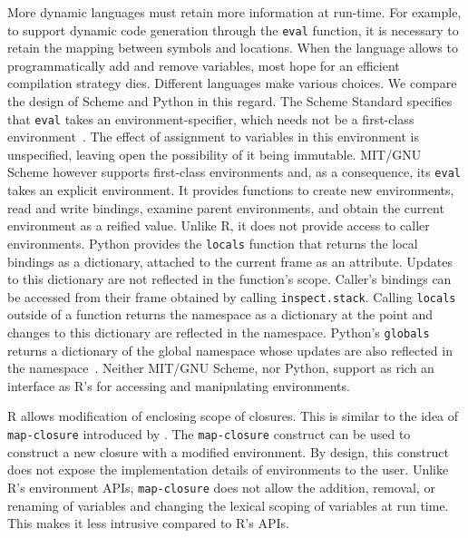 \documentclass[10pt,review,sigplan,authorversion=true]{acmart}
\newcommand{\code}[1]{\lstinline |#1|\xspace}
\renewcommand{\c}[1]{\lstinline |#1|\xspace}
\begin{document}
More dynamic languages must retain more information at run-time. For example, to
support dynamic code generation through the \c{eval} function, it is necessary
to retain the mapping between symbols and locations. When the language allows to
programmatically add and remove variables, most hope for an efficient
compilation strategy dies. Different languages make various choices. We compare
the design of Scheme and Python in this regard. The Scheme Standard specifies
that \code{eval} takes an environment-specifier, which needs not be a
first-class environment~\cite{SchemeR5RS}. The effect of assignment to variables
in this environment is unspecified, leaving open the possibility of it being
immutable. MIT/GNU Scheme however supports first-class environments and, as a
consequence, its \code{eval} takes an explicit environment. It provides
functions to create new environments, read and write bindings, examine parent
environments, and obtain the current environment as a reified value. Unlike R,
it does not provide access to caller environments. Python provides the
\code{locals} function that returns the local bindings as a dictionary, attached
to the current frame as an attribute. Updates to this dictionary are not
reflected in the function's scope. Caller's bindings can be accessed from their
frame obtained by calling \code{inspect.stack}. Calling \code{locals} outside of
a function returns the namespace as a dictionary at the point and changes to
this dictionary are reflected in the namespace. Python's \code{globals} returns
a dictionary of the global namespace whose updates are also reflected in the
namespace~\cite{}. Neither MIT/GNU Scheme, nor Python, support as rich an
interface as R's for accessing and manipulating environments.

R allows modification of enclosing scope of closures. This is similar to the
idea of \c{map-closure} introduced by \citet{Siskind07}. The \c{map-closure}
construct can be used to construct a new closure with a modified environment. By
design, this construct does not expose the implementation details of
environments to the user. Unlike R's environment APIs, \c{map-closure} does not
allow the addition, removal, or renaming of variables and changing the lexical
scoping of variables at run time. This makes it less intrusive compared to R's
APIs.
\end{document}
